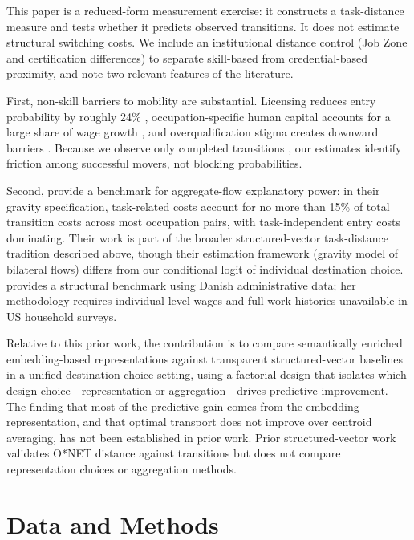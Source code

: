 \documentclass[12pt]{article}
\begin{document}
This paper is a reduced-form measurement exercise: it constructs a task-distance measure and tests whether it predicts observed transitions. It does not estimate structural switching costs. We include an institutional distance control (Job Zone and certification differences) to separate skill-based from credential-based proximity, and note two relevant features of the literature.

First, non-skill barriers to mobility are substantial. Licensing reduces entry probability by roughly 24\% \citep{Jackson2023}, occupation-specific human capital accounts for a large share of wage growth \citep{GathmannSchonberg2010,KambourovManovskii2009}, and overqualification stigma creates downward barriers \citep{Pedulla2016}. Because we observe only completed transitions \citep{Heckman1979}, our estimates identify friction among successful movers, not blocking probabilities.

Second, \citet{CortesGallipoli2018} provide a benchmark for aggregate-flow explanatory power: in their gravity specification, task-related costs account for no more than 15\% of total transition costs across most occupation pairs, with task-independent entry costs dominating. Their work is part of the broader structured-vector task-distance tradition described above, though their estimation framework (gravity model of bilateral flows) differs from our conditional logit of individual destination choice. \citet{Traiberman2019} provides a structural benchmark using Danish administrative data; her methodology requires individual-level wages and full work histories unavailable in US household surveys.

Relative to this prior work, the contribution is to compare semantically enriched embedding-based representations against transparent structured-vector baselines in a unified destination-choice setting, using a factorial design that isolates which design choice---representation or aggregation---drives predictive improvement. The finding that most of the predictive gain comes from the embedding representation, and that optimal transport does not improve over centroid averaging, has not been established in prior work. Prior structured-vector work \citep{MouwEtAl2024,SchuStanTaska2024} validates O*NET distance against transitions but does not compare representation choices or aggregation methods.


\section{Data and Methods}
\label{sec:data}
\end{document}
